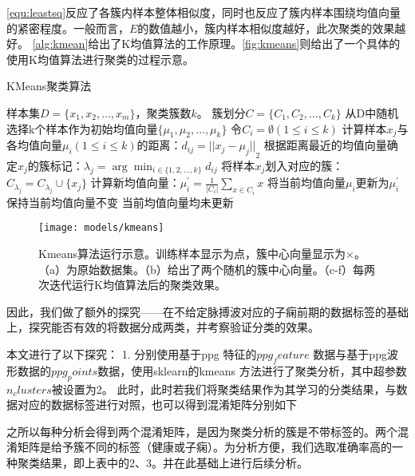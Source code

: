 \autoref{equ:leastsq}反应了各簇内样本整体相似度，同时也反应了簇内样本围绕均值向量的紧密程度。一般而言，$E$的数值越小，簇内样本相似度越好，此次聚类的效果越好。
\autoref{alg:kmean}给出了K均值算法的工作原理。\autoref{fig:kmeans}则给出了一个具体的使用K均值算法进行聚类的过程示意。
\begin{breakablealgorithm}
    \caption[KMeans聚类算法]{KMeans聚类算法\cite{Zhou2016}}
    \label{alg:kmean}
    \begin{algorithmic}[1] %
        \Require 样本集$D=\{x_1,x_2,\dots,x_m\}$，聚类簇数$k$。
        \Ensure 簇划分$C=\{C_1,C_2,\dots,C_k\}$
        \State 从D中随机选择k个样本作为初始均值向量$\{\mu_1,\mu_2,\dots,\mu_k\}$
        \Repeat
        \State 令$C_i=\emptyset (1\le i\le k)$
                \State 计算样本$x_j$与各均值向量$\mu_i (1\le i \le k)$的距离：$d_{ij}={||x_j - \mu_j||}_2$
                \State 根据距离最近的均值向量确定$x_j$的簇标记：$\lambda_j = \arg \min_{i \in \{1,2,\dots,k\}} d_{ij}$
                \State 将样本$x_j$划入对应的簇：$C_{\lambda_j} = C_{\lambda_j} \cup \{x_j\}$
            \EndFor
                \State 计算新均值向量：$\mu_i^{'}=\frac{1}{|C_i|} \sum_{x \in C_i}{x}$
                    \State 将当前均值向量$\mu_i$更新为$\mu_i^{'}$
                \Else
                    \State 保持当前均值向量不变
                \EndIf
            \EndFor
        \Until 当前均值向量均未更新
    \end{algorithmic}
\end{breakablealgorithm}
\begin{figure}[htbp]
    \centering
    \texttt{[image: models/kmeans]}
    \caption[Kmeans算法运行示意]{\label{fig:kmeans}Kmeans算法运行示意\cite{kmeans}。训练样本显示为点，簇中心向量显示为$\times$。（a）为原始数据集。（b）给出了两个随机的簇中心向量。（c-f）每两次迭代运行K均值算法后的聚类效果。}
\end{figure}

因此，我们做了额外的探究——在不给定脉搏波对应的子痫前期的数据标签的基础上，探究能否有效的将数据分成两类，并考察验证分类的效果。

本文进行了以下探究：
1.	分别使用基于ppg 特征的$ppg_feature$ 数据与基于ppg波形数据的$ppg_points $数据，使用sklearn的kmeans 方法进行了聚类分析，其中超参数$n_clusters$被设置为2。
此时，此时若我们将聚类结果作为其学习的分类结果，与数据对应的数据标签进行对照，也可以得到混淆矩阵分别如下

之所以每种分析会得到两个混淆矩阵，是因为聚类分析的簇是不带标签的。两个混淆矩阵是给予簇不同的标签（健康或子痫）。为分析方便，我们选取准确率高的一种聚类结果，即上表中的2、3。并在此基础上进行后续分析。

